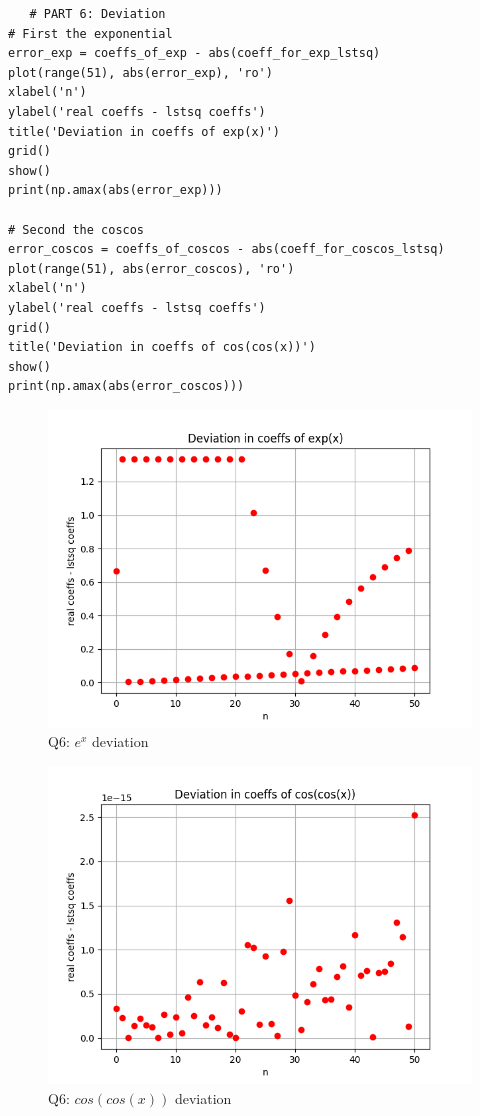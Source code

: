 \documentclass[11pt, a4paper]{article}
\begin{document}
   \begin{verbatim}
   # PART 6: Deviation
# First the exponential
error_exp = coeffs_of_exp - abs(coeff_for_exp_lstsq)
plot(range(51), abs(error_exp), 'ro')
xlabel('n')
ylabel('real coeffs - lstsq coeffs')
title('Deviation in coeffs of exp(x)')
grid()
show()
print(np.amax(abs(error_exp)))

# Second the coscos
error_coscos = coeffs_of_coscos - abs(coeff_for_coscos_lstsq)
plot(range(51), abs(error_coscos), 'ro')
xlabel('n')
ylabel('real coeffs - lstsq coeffs')
grid()
title('Deviation in coeffs of cos(cos(x))')
show()
print(np.amax(abs(error_coscos)))
   \end{verbatim}    
   \begin{figure}[!tbh]
   	\centering
  \includegraphics[scale=0.5]{q6-exp.png} 
    \caption{Q6: $e^x$ deviation}
   	\label{fig: deviation exp()}
   \end{figure}
   
   \begin{figure}[!tbh]
   	\centering
  \includegraphics[scale=0.5]{q6-cos.png} 
    \caption{Q6: $cos(cos(x))$ deviation}
   	\label{fig: deviaton coscos()}
   \end{figure}
   
\end{document}
